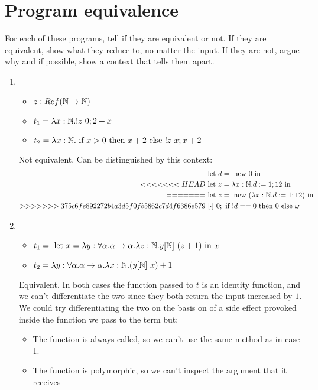 \documentclass{article}
\begin{document}
\section{Program equivalence}
For each of these programs, tell if they are equivalent or not. If they are equivalent, show what they reduce to, no matter the input. If they are not, argue why and if possible, show a context that tells them apart.
\begin{enumerate}
    \item
        \begin{itemize}
            \item $z:Ref(\mathbb N\to\mathbb N)$
            \item $t_1=\lam{x:\N}{!z\ 0;2+x}$
            \item $t_2=\lam{x:\N}{\IF x>0 \THEN x+2 \ELSE !z\ x;x+2}$
        \end{itemize}
        Not equivalent. Can be distinguished by this context:
        \begin{align*}
            & \LET d = \NEW 0 \TIN\\
<<<<<<< HEAD
            & \LET z = \lam{x:\N}{d:=1;12} \TIN\\
=======
            & \LET z = \NEW(\lam{x:\N}{d:=1;12}) \TIN\\
>>>>>>> 375c6fe892272b4a3d5f0fb5862c7d4f6386e579
            &\ [\cdot]\ 0; \IF !d == 0 \THEN 0 \ELSE \omega
        \end{align*}

    \item 
        \begin{itemize}
            \item $t_1= \LET x=\lam{y:\forall\alpha.\alpha\to\alpha}\lam{z:\N}{y[\N]\ (z+1)} \TIN x$
            \item $t_2= \lam{y:\forall\alpha.\alpha\to\alpha}\lam{x:\N}{(y[\N]\ x)+1}$
        \end{itemize}
        Equivalent. In both cases the function passed to $t$ is an identity function, and we can't differentiate the two since they both return the input increased by $1$. \\
        We could try differentiating the two on the basis on of a side effect provoked inside the function we pass to the term but:
        \begin{itemize}
            \item The function is always called, so we can't use the same method as in case 1.
            \item The function is polymorphic, so we can't inspect the argument that it receives
        \end{itemize}


\end{enumerate}
\end{document}
